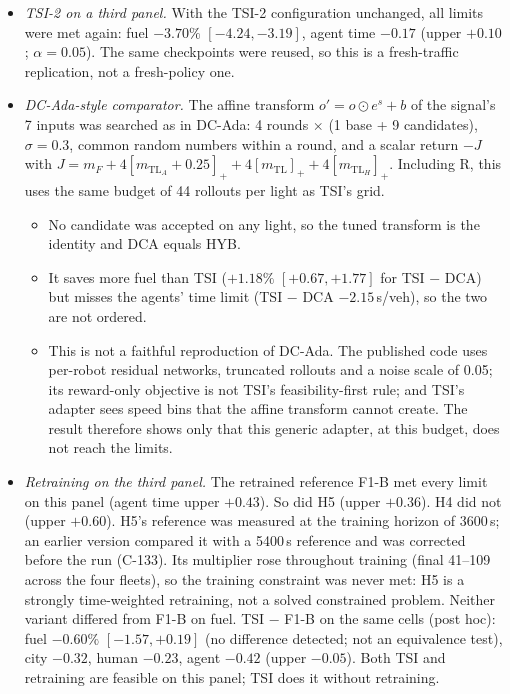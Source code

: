 \documentclass[11pt]{article}
\begin{document}
\begin{itemize}
\item \emph{TSI-2 on a third panel.} With the TSI-2 configuration unchanged, all limits were met again: fuel $-3.70\%$ $[-4.24,-3.19]$,
agent time $-0.17$ (upper $+0.10$; $\alpha=0.05$). The same checkpoints were reused, so this is a fresh-traffic replication, not a
fresh-policy one.
\item \emph{DC-Ada-style comparator.} The affine transform $o'=o\odot e^{s}+b$ of the signal's 7 inputs was searched as in DC-Ada:
4 rounds $\times$ (1 base + 9 candidates), $\sigma=0.3$, common random numbers within a round, and a scalar return
$-J$ with $J=m_F+4[m_{\mathrm{TL}_A}+0.25]_++4[m_{\mathrm{TL}}]_++4[m_{\mathrm{TL}_H}]_+$. Including R, this uses the same budget of 44
rollouts per light as TSI's grid.
\begin{itemize}\setlength\itemsep{0pt}
\item No candidate was accepted on any light, so the tuned transform is the identity and DCA equals HYB.
\item It saves more fuel than TSI ($+1.18\%$ $[+0.67,+1.77]$ for TSI $-$ DCA) but misses the agents' time limit (TSI $-$ DCA $-2.15$\,s/veh),
so the two are not ordered.
\item This is not a faithful reproduction of DC-Ada. The published code uses per-robot residual networks, truncated rollouts and a noise scale
of 0.05; its reward-only objective is not TSI's feasibility-first rule; and TSI's adapter sees speed bins that the affine transform cannot
create. The result therefore shows only that this generic adapter, at this budget, does not reach the limits.
\end{itemize}
\item \emph{Retraining on the third panel.} The retrained reference F1-B met every limit on this panel (agent time upper $+0.43$). So did
H5 (upper $+0.36$). H4 did not (upper $+0.60$). H5's reference was measured at the training horizon of 3600\,s; an earlier
version compared it with a 5400\,s reference and was corrected before the run (C-133). Its multiplier rose throughout training (final
41--109 across the four fleets), so the training constraint was never met: H5 is a strongly time-weighted retraining, not a solved
constrained problem. Neither variant differed from F1-B on fuel. TSI $-$ F1-B on the same cells (post hoc):
fuel $-0.60\%$ $[-1.57,+0.19]$ (no difference detected; not an equivalence test), city $-0.32$, human $-0.23$, agent $-0.42$ (upper
$-0.05$). Both TSI and retraining are feasible on this panel; TSI does it without retraining.

\end{itemize}
\end{document}
